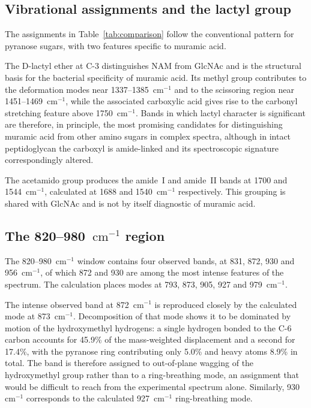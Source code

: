 \documentclass[11pt,a4paper]{article}
\newcommand{\wn}{\ensuremath{\mathrm{cm}^{-1}}}
\begin{document}
\subsection{Vibrational assignments and the lactyl group}

The assignments in Table~\ref{tab:comparison} follow the conventional pattern
for pyranose sugars, with two features specific to muramic acid.

The D-lactyl ether at C-3 distinguishes NAM from GlcNAc and is the structural
basis for the bacterial specificity of muramic acid. Its methyl group
contributes to the deformation modes near 1337--1385~\wn{} and to the
scissoring region near 1451--1469~\wn{}, while the associated carboxylic acid
gives rise to the carbonyl stretching feature above 1750~\wn{}. Bands in
which lactyl character is significant are therefore, in principle, the most
promising candidates for distinguishing muramic acid from other amino sugars
in complex spectra, although in intact peptidoglycan the carboxyl is
amide-linked and its spectroscopic signature correspondingly altered.

The acetamido group produces the amide~I and amide~II bands at 1700 and
1544~\wn{}, calculated at 1688 and 1540~\wn{} respectively. This grouping is
shared with GlcNAc and is not by itself diagnostic of muramic acid.

\subsection{The 820--980~\wn{} region}
\label{sec:anomer}

The 820--980~\wn{} window contains four observed bands, at 831, 872, 930 and
956~\wn{}, of which 872 and 930 are among the most intense features of the
spectrum. The calculation places modes at 793, 873, 905, 927 and 979~\wn{}.

The intense observed band at 872~\wn{} is reproduced closely by the calculated
mode at 873~\wn{}. Decomposition of that mode shows it to be dominated by
motion of the hydroxymethyl hydrogens: a single hydrogen bonded to the C-6
carbon accounts for 45.9\% of the mass-weighted displacement and a second for
17.4\%, with the pyranose ring contributing only 5.0\% and heavy atoms 8.9\%
in total. The band is therefore assigned to out-of-plane wagging of the
hydroxymethyl group rather than to a ring-breathing mode, an assignment that
would be difficult to reach from the experimental spectrum alone. Similarly,
930~\wn{} corresponds to the calculated 927~\wn{} ring-breathing mode.
\end{document}
